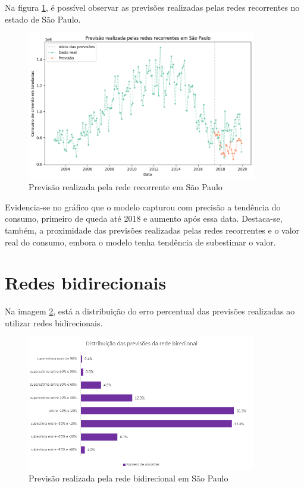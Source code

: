Na figura \ref{img:consumo-sp-rnn}, é possível observar as previsões realizadas pelas 
redes recorrentes no estado de São Paulo.

\begin{figure}[H]
    \centering
    \includegraphics[width=10cm]{../figuras/graficos/rnn/prev_sp.png}
    \caption{Previsão realizada pela rede recorrente em São Paulo}
    \label{img:consumo-sp-rnn}
\end{figure}

Evidencia-se no gráfico que o modelo capturou com precisão a tendência do 
consumo, primeiro de queda até 2018 e aumento após essa data. Destaca-se, 
também, a proximidade das previsões realizadas pelas redes recorrentes e o 
valor real do consumo, embora o modelo tenha tendência de subestimar o valor.


\section{Redes bidirecionais}

Na imagem \ref{img:erro-perc-bnn}, está a distribuição do erro percentual das 
previsões realizadas ao utilizar redes bidirecionais. 

\begin{figure}[H]
    \centering
    \includegraphics[width=10cm]{../figuras/graficos/bi/erro-perc-bi.png}
    \caption{Previsão realizada pela rede bidirecional em São Paulo}
    \label{img:erro-perc-bnn}
\end{figure}


